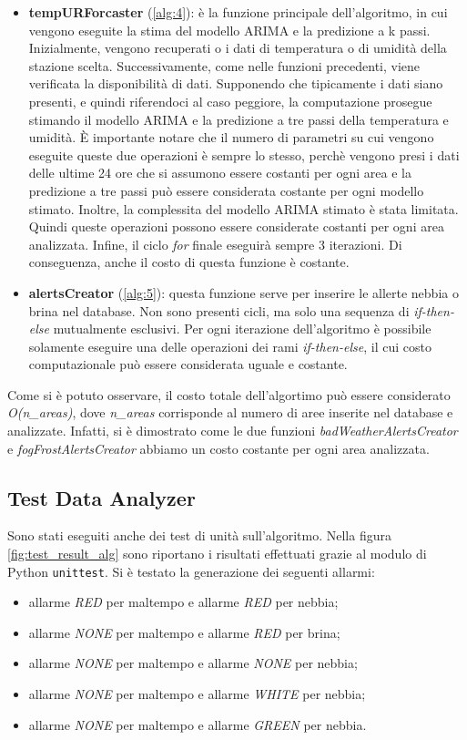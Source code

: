 \begin{itemize}
	\item \textbf{tempURForcaster} (\Alg\ref{alg:4}): è la funzione principale dell'algoritmo, in cui vengono eseguite la stima del modello ARIMA e la predizione a k passi. Inizialmente, vengono recuperati o i dati di temperatura o di umidità della stazione scelta. Successivamente, come nelle funzioni precedenti, viene verificata la disponibilità di dati. Supponendo che tipicamente i dati siano presenti, e quindi riferendoci al caso peggiore, la computazione prosegue stimando il modello ARIMA e la predizione a tre passi della temperatura e umidità. \`E importante notare che il numero di parametri su cui vengono eseguite queste due operazioni è sempre lo stesso, perchè vengono presi i dati delle ultime 24 ore che si assumono essere costanti per ogni area e la predizione a tre passi può essere considerata costante per ogni modello stimato. Inoltre, la complessita del modello ARIMA stimato è stata limitata. Quindi queste operazioni possono essere considerate costanti per ogni area analizzata. Infine, il ciclo \textit{for} finale eseguirà sempre 3 iterazioni. Di conseguenza, anche il costo di questa funzione è costante. 

	\item \textbf{alertsCreator} (\Alg\ref{alg:5}): questa funzione serve per inserire le allerte nebbia o brina nel database. Non sono presenti cicli, ma solo una sequenza di \textit{if-then-else} mutualmente esclusivi. Per ogni iterazione dell'algoritmo è possibile solamente eseguire una delle operazioni dei rami \textit{if-then-else}, il cui costo computazionale può essere considerata uguale e costante.
\end{itemize}

Come si è potuto osservare, il costo totale dell'algortimo può essere considerato \textit{O(n\_areas)}, dove \textit{n\_areas} corrisponde al numero di aree inserite nel database e analizzate. Infatti, si è dimostrato come le due funzioni \textit{badWeatherAlertsCreator} e \textit{fogFrostAlertsCreator} abbiamo un costo costante per ogni area analizzata.

\clearpage

\subsection{Test Data Analyzer}
Sono stati eseguiti anche dei test di unità sull'algoritmo. Nella figura \ref{fig:test_result_alg} sono riportano i risultati effettuati grazie al modulo di Python \texttt{unittest}. Si è testato la generazione dei seguenti allarmi:
\begin{itemize}
	\item allarme \textit{RED} per maltempo e allarme \textit{RED} per nebbia;
	\item allarme \textit{NONE} per maltempo e allarme \textit{RED} per brina;
	\item allarme \textit{NONE} per maltempo e allarme \textit{NONE} per nebbia;
	\item allarme \textit{NONE} per maltempo e allarme \textit{WHITE} per nebbia;
	\item allarme \textit{NONE} per maltempo e allarme \textit{GREEN} per nebbia.
\end{itemize}

